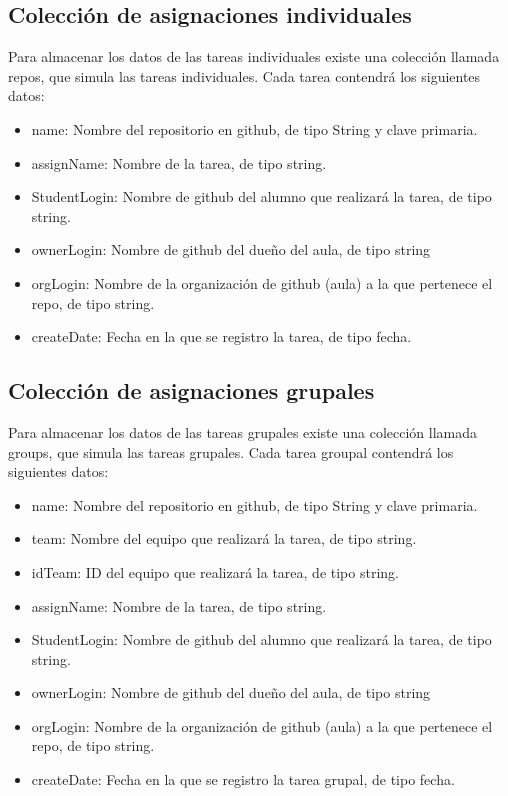 \subsection{Colección de asignaciones individuales}
\label{3:4:4}

Para almacenar los datos de las tareas individuales existe una colección llamada repos, que simula las tareas individuales. Cada tarea contendrá los siguientes datos:

\begin{itemize}
  \item name: Nombre del repositorio en github, de tipo String y clave primaria.
  \item assignName: Nombre de la tarea, de tipo string.
  \item StudentLogin: Nombre de github del alumno que realizará la tarea, de tipo string.
  \item ownerLogin: Nombre de github del dueño del aula, de tipo string
  \item orgLogin: Nombre de la organización de github (aula) a la que pertenece el repo, de tipo string.
  \item createDate: Fecha en la que se registro la tarea, de tipo fecha.
\end{itemize}

\subsection{Colección de asignaciones grupales}
\label{3:4:5}

Para almacenar los datos de las tareas grupales existe una colección llamada groups, que simula las tareas grupales. Cada tarea groupal contendrá los siguientes datos:

\begin{itemize}
  \item name: Nombre del repositorio en github, de tipo String y clave primaria.
  \item team: Nombre del equipo que realizará la tarea, de tipo string.
  \item idTeam: ID del equipo que realizará la tarea, de tipo string.
  \item assignName: Nombre de la tarea, de tipo string.
  \item StudentLogin: Nombre de github del alumno que realizará la tarea, de tipo string.
  \item ownerLogin: Nombre de github del dueño del aula, de tipo string
  \item orgLogin: Nombre de la organización de github (aula) a la que pertenece el repo, de tipo string.
  \item createDate: Fecha en la que se registro la tarea grupal, de tipo fecha.
\end{itemize}

